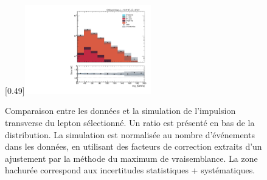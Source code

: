 \begin{figure}[p!]
    [0.49\textwidth]{\includegraphics[width=0.49\textwidth,angle=-90,origin=c]{annexes/figs/higgs/data_mc/1-btag/semie/leptonPt_reco_fullsel.pdf}}
    \caption{Comparaison entre les données et la simulation de l'impulsion transverse du lepton sélectionné. Un ratio est présenté en bas de la distribution. La simulation est normalisée au nombre d'événements dans les données, en utilisant des facteurs de correction extraits d'un ajustement par la méthode du maximum de vraisemblance. La zone hachurée correspond aux incertitudes statistiques + systématiques.}
    \label{fig:higgs_data_mc_lepton}
\end{figure}

